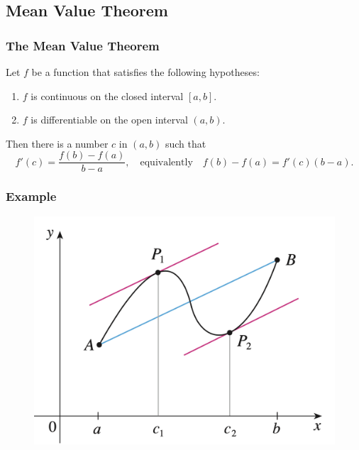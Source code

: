 \documentclass[t]{beamer}
\theoremstyle{plain}
\theoremstyle{definition}
\begin{document}
\subsection{Mean Value Theorem}

\begin{frame}
\frametitle{The Mean Value Theorem}

\begin{theorem}
Let $f$ be a function that satisfies the following hypotheses:
\begin{enumerate}
\item $f$ is continuous on the closed interval $[a,b]$.
\item $f$ is differentiable on the open interval $(a,b)$.
\end{enumerate}
Then there is a number $c$ in $(a,b)$ such that
\[f'(c) = \frac{f(b) - f(a)}{b-a}, \quad \text{equivalently} \quad f(b) - f(a) = f'(c)(b-a).\]
\end{theorem}

\end{frame}

\begin{frame}

\frametitle{Example}

\begin{figure}[t]
\begin{center}
\includegraphics[scale=0.3]{fig/mvt}
\end{center}
\end{figure}

\end{frame}
\end{document}
